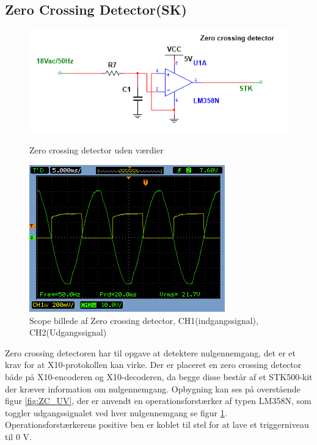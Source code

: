 \subsection{Zero Crossing Detector(SK)}
\begin{figure}[htb]
  \begin{minipage}{0.45\textwidth}
    \centering
      \includegraphics[width=\textwidth]{billeder/HWdesign/ZC_UV}
      \caption{Zero crossing detector uden værdier}
    \label{fig:ZC_UV}
  \end{minipage}
  \hspace{0.1\textwidth}
  \begin{minipage}{0.45\textwidth}
    \centering
      \includegraphics[width=\textwidth]{billeder/HWTest/Encoder/Encoder_zerocross}
      \caption{Scope billede af Zero crossing detector, CH1(indgangssignal), CH2(Udgangssignal)}
    \label{fig:Encoder_Zerocross}
  \end{minipage}
\end{figure}

Zero crossing detectoren har til opgave at detektere nulgennemgang, det er et krav for at X10-protokollen kan virke. Der er placeret en zero crossing detector både på X10-encoderen og X10-decoderen, da begge disse består af et STK500-kit der kræver information om nulgennemgang. Opbygning kan ses på overstående figur \ref{fig:ZC_UV}, der er anvendt en operationsforstærker af typen LM358N, som toggler udgangssignalet ved hver nulgennemgang se figur \ref{fig:Encoder_Zerocross}. Operationsforstærkerens positive ben er koblet til stel for at lave et triggerniveau til 0 V.

